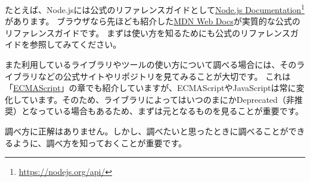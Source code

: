 たとえば、Node.jsには公式のリファレンスガイドとして\href{https://nodejs.org/api/}{Node.js
Documentation}\footnote{\url{https://nodejs.org/api/}}があります。
ブラウザなら先ほども紹介した\href{https://developer.mozilla.org/ja/}{MDN
Web Docs}が実質的な公式のリファレンスガイドです。
まずは使い方を知るためにも公式のリファレンスガイドを参照してみてください。

また利用しているライブラリやツールの使い方について調べる場合には、そのライブラリなどの公式サイトやリポジトリを見てみることが大切です。
これは「\hyperlink{ecmascript}{ECMAScript}」の章でも紹介していますが、ECMAScriptやJavaScriptは常に変化しています。そのため、ライブラリによってはいつのまにかDeprecated（非推奨）となっている場合もあるため、まずは元となるものを見ることが重要です。

調べ方に正解はありません。しかし、調べたいと思ったときに調べることができるように、調べ方を知っておくことが重要です。
